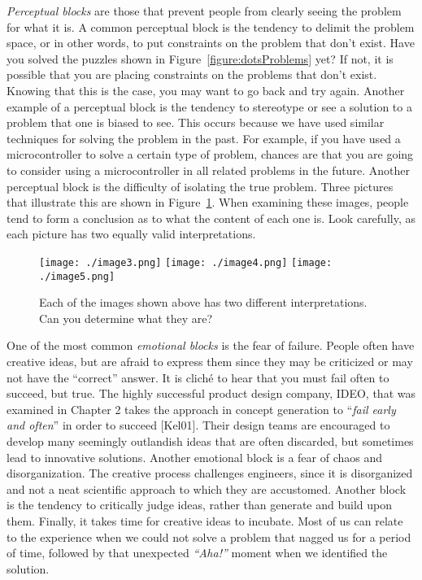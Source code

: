 \emph{Perceptual blocks} are those that prevent people from clearly
seeing the problem for what it is. A common perceptual block is the
tendency to delimit the problem space, or in other words, to put
constraints on the problem that don't exist. Have you solved the puzzles
shown in Figure~\ref{figure:dotsProblems} yet? If not, it is possible that you are placing
constraints on the problems that don't exist. Knowing that this is the
case, you may want to go back and try again. Another example of a
perceptual block is the tendency to stereotype or see a solution to a
problem that one is biased to see. This occurs because we have used
similar techniques for solving the problem in the past. For example, if
you have used a microcontroller to solve a certain type of problem,
chances are that you are going to consider using a microcontroller in
all related problems in the future. Another perceptual block is the
difficulty of isolating the true problem. Three pictures that illustrate
this are shown in Figure~\ref{figure:differentInterpertations}. When examining these images, people tend
to form a conclusion as to what the content of each one is. Look
carefully, as each picture has two equally valid interpretations.

\begin{figure}
\texttt{[image: ./image3.png]}\hfill
\texttt{[image: ./image4.png]}\hfill
\texttt{[image: ./image5.png]}\hfill
\caption{Each of the images shown above has two different
interpretations. Can you determine what they are?}
\label{figure:differentInterpertations}
\end{figure}


One of the most common \emph{emotional blocks} is the fear of failure.
People often have creative ideas, but are afraid to express them since
they may be criticized or may not have the ``correct'' answer. It is
cliché to hear that you must fail often to succeed, but true. The highly
successful product design company, IDEO, that was examined in Chapter 2
takes the approach in con­cept generation to ``\emph{fail early and
often}'' in order to succeed {[}Kel01{]}. Their design teams are
en­couraged to develop many seemingly outlandish ideas that are often
discarded, but some­times lead to innovative solutions. Another emotional
block is a fear of chaos and disorgani­zation. The creative process
challenges engineers, since it is disorganized and not a neat scien­tific
approach to which they are accustomed. Another block is the tendency to
critically judge ideas, rather than generate and build upon them.
Finally, it takes time for creative ideas to incubate. Most of us can
relate to the experience when we could not solve a problem that nagged
us for a period of time, followed by that unexpected \emph{``Aha!''}
moment when we identi­fied the solution.

